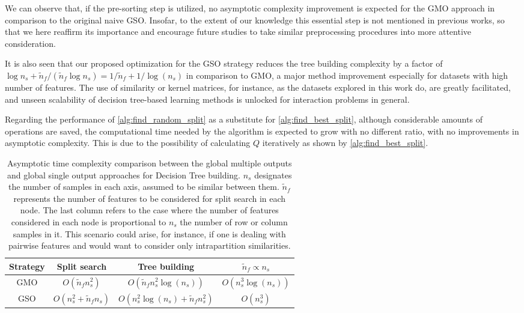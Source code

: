We can observe that, if the pre-sorting step is utilized, no asymptotic complexity improvement is expected for the GMO approach in comparison to the original naive GSO. Insofar, to the extent of our knowledge this essential step is not mentioned in previous works, so that we here reaffirm its importance and encourage future studies to take similar preprocessing procedures into more attentive consideration.

It is also seen that our proposed optimization for the GSO strategy reduces the tree building complexity by a factor of $\log n_s + \tilde n_f / (\tilde n_f \log n_s ) = 1/\tilde n_f + 1/\log(n_s)$ in comparison to GMO, a major method improvement especially for datasets with high number of features. The use of similarity or kernel matrices, for instance, as the datasets explored in this work do, are greatly facilitated, and unseen scalability of decision tree-based learning methods is unlocked for interaction problems in general.

Regarding the performance of \ref{alg:find_random_split} as a substitute for \ref{alg:find_best_split}, although considerable amounts of operations are saved, the computational time needed by the algorithm is expected to grow with no different ratio, with no improvements in asymptotic complexity. This is due to the possibility of calculating $Q$ iteratively as shown by \ref{alg:find_best_split}.

\begin{table*}[h]
    \centering
    \begin{tabular}{c|c|c|c}
        Strategy & Split search & Tree building & $\tilde n_f \propto n_s$
        \\
        \hline \hline
        GMO
            & $O(\tilde n_f n_s^2)$
            & $O(\tilde n_f n_s^2\log(n_s))$
            & $O(n_s^3\log(n_s))$
        \\
        GSO
            & $O(n_s^2 + \tilde n_f n_s)$
            & $O(n_s^2\log(n_s) + \tilde n_f n_s^2)$
            & $O(n_s^3)$
        \\
        \hline
    \end{tabular}
    \caption{
        Asymptotic time complexity comparison between the global multiple outputs
        and global single output approaches for Decision Tree building. $n_s$ designates the number of samples in each axis, assumed to be similar between them. $\tilde n_f$ represents the number of features to be considered for split search in each node. The last column refers to the case where the number of features considered in each node is proportional to $n_s$ the number of row or column samples in it. This scenario could arise, for instance, if one is dealing with pairwise features and would want to consider only intrapartition similarities. 
    }
    \label{tab:O_comparison}
\end{table*}


